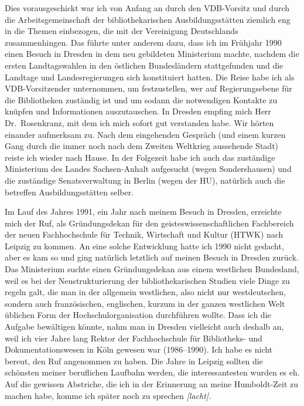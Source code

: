 \documentclass[a4paper,
fontsize=11pt,
oneside,
numbers=noperiodatend,
parskip=half-,
bibliography=totoc,
final
]{scrartcl}
\begin{document}
Dies vorausgeschickt war ich von Anfang an durch den VDB-Vorsitz und
durch die Arbeitsgemeinschaft der bibliothekarischen Ausbildungsstätten
ziemlich eng in die Themen einbezogen, die mit der Vereinigung
Deutschlands zusammenhingen. Das führte unter anderem dazu, dass ich im
Frühjahr 1990 einen Besuch in Dresden in dem neu gebildeten Ministerium
machte, nachdem die ersten Landtagswahlen in den östlichen Bundesländern
stattgefunden und die Landtage und Landesregierungen sich konstituiert
hatten. Die Reise habe ich als VDB-Vorsitzender unternommen, um
festzustellen, wer auf Regierungsebene für die Bibliotheken zuständig
ist und um sodann die notwendigen Kontakte zu knüpfen und Informationen
auszutauschen. In Dresden empfing mich Herr Dr.~Rosenkranz, mit dem ich
mich sofort gut verstanden habe. Wir hörten einander aufmerksam zu. Nach
dem eingehenden Gespräch (und einem kurzen Gang durch die immer noch
nach dem Zweiten Weltkrieg aussehende Stadt) reiste ich wieder nach
Hause. In der Folgezeit habe ich auch das zuständige Ministerium des
Landes Sachsen-Anhalt aufgesucht (wegen Sondershausen) und die
zuständige Senatsverwaltung in Berlin (wegen der HU), natürlich auch die
betreffen Ausbildungsstätten selber.

Im Lauf des Jahres 1991, ein Jahr nach meinem Besuch in Dresden,
erreichte mich der Ruf, als Gründungsdekan für den
geisteswissenschaftlichen Fachbereich der neuen Fachhochschule für
Technik, Wirtschaft und Kultur (HTWK) nach Leipzig zu kommen. An eine
solche Entwicklung hatte ich 1990 nicht gedacht, aber es kam so und ging
natürlich letztlich auf meinen Besuch in Dresden zurück. Das Ministerium
suchte einen Gründungsdekan aus einem westlichen Bundesland, weil es bei
der Neustrukturierung der bibliothekarischen Studien viele Dinge zu
regeln galt, die man in der allgemein westlichen, also nicht nur
westdeutschen, sondern auch französischen, englischen, kurzum in der
ganzen westlichen Welt üblichen Form der Hochschulorganisation
durchführen wollte. Dass ich die Aufgabe bewältigen könnte, nahm man in
Dresden vielleicht auch deshalb an, weil ich vier Jahre lang Rektor der
Fachhochschule für Bibliotheks- und Dokumentationswesen in Köln gewesen
war (1986--1990). Ich habe es nicht bereut, den Ruf angenommen zu haben.
Die Jahre in Leipzig sollten die schönsten meiner beruflichen Laufbahn
werden, die interessantesten wurden es eh. Auf die gewissen Abstriche,
die ich in der Erinnerung an meine Humboldt-Zeit zu machen habe, komme
ich später noch zu sprechen \emph{{[}lacht{]}.}
\end{document}
